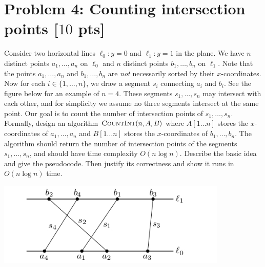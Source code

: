 \documentclass[11pt,twoside]{article}
\newcommand{\problem}[1]{\section*{Problem #1}}
\begin{document}
\problem{4: Counting intersection points [$10$ pts]}
Consider two horizontal lines $\ell_0: y = 0$ and $\ell_1:y = 1$ in the plane.
We have $n$ distinct points $a_1,\dots,a_n$ on $\ell_0$ and $n$ distinct points $b_1,\dots,b_n$ on $\ell_1$.
Note that the points $a_1,\dots,a_n$ and $b_1,\dots,b_n$ are \textit{not} necessarily sorted by their $x$-coordinates.
Now for each $i \in \{1,\dots,n\}$, we draw a segment $s_i$ connecting $a_i$ and $b_i$.
See the figure below for an example of $n = 4$.
These segments $s_1,\dots,s_n$ may intersect with each other, and for simplicity we assume no three segments intersect at the same point.
Our goal is to count the number of intersection points of $s_1,\dots,s_n$.
Formally, design an algorithm $\textsc{CountInt}(n,A,B)$ where $A[1 \dots n]$ stores the $x$-coordinates of $a_1,\dots,a_n$ and $B[1 \dots n]$ stores the $x$-coordinates of $b_1,\dots,b_n$.
The algorithm should return the number of intersection points of the segments $s_1,\dots,s_n$, and should have time complexity $O(n \log n)$.
Describe the basic idea and give the pseudocode.
Then justify its correctness and show it runs in $O(n \log n)$ time.

\begin{center}
    \includegraphics[height=4cm]{hw-fig-intersection.jpg}
\end{center}
\end{document}
